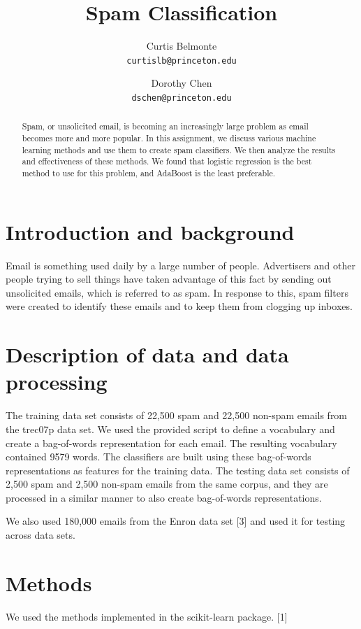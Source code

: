 \documentclass{article} %
\title{Spam Classification}
\author{Curtis Belmonte\\
{\tt\small curtislb@princeton.edu}
\and
Dorothy Chen\\
{\tt\small dschen@princeton.edu}
}
\begin{document}
\maketitle

\begin{abstract}
Spam, or unsolicited email, is becoming an increasingly large problem as email becomes more and more popular. In this assignment, we discuss various machine learning methods and use them to create spam classifiers. We then analyze the results and effectiveness of these methods. We found that logistic regression is the best method to use for this problem, and AdaBoost is the least preferable. 
\end{abstract}

\section{Introduction and background}
Email is something used daily by a large number of people. Advertisers and other people trying to sell things have taken advantage of this fact by sending out unsolicited emails, which is referred to as spam. In response to this, spam filters were created to identify these emails and to keep them from clogging up inboxes.

\section{Description of data and data processing}
The training data set consists of 22,500 spam and 22,500 non-spam emails from the trec07p data set. We used the provided script to define a vocabulary and create a bag-of-words representation for each email. The resulting vocabulary contained 9579 words. The classifiers are built using these bag-of-words representations as features for the training data. The testing data set consists of 2,500 spam and 2,500 non-spam emails from the same corpus, and they are processed in a similar manner to also create bag-of-words representations. 

We also used 180,000 emails from the Enron data set [3] and used it for testing across data sets. 

\section{Methods}
We used the methods implemented in the scikit-learn package. [1]
\end{document}
